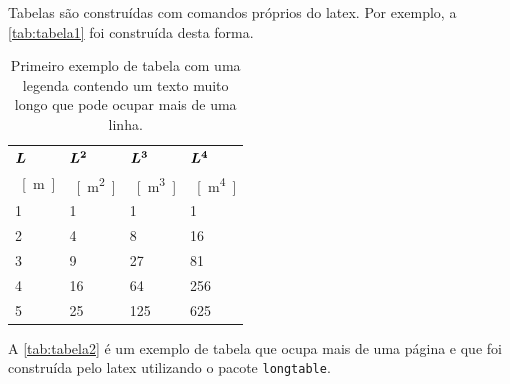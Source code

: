 Tabelas são construídas com comandos próprios do \gls{latex}. Por exemplo, a \autoref{tab:tabela1} foi construída desta forma.

\begin{table}[htb]%
\caption{Primeiro exemplo de tabela com uma legenda contendo um texto muito longo que pode ocupar mais de uma linha.}%
\label{tab:tabela1}%
\begin{tabularx}{\textwidth}{@{\extracolsep{\fill}}llll}%
\toprule
$\boldsymbol{L}$ & $\boldsymbol{L^2}$ & $\boldsymbol{L^3}$ & $\boldsymbol{L^4}$ \\
\SI{}{[m]} & \SI{}{[m^2]} & \SI{}{[m^3]} & \SI{}{[m^4]} \\ \midrule
1          & 1            & 1            & 1            \\
2          & 4            & 8            & 16           \\
3          & 9            & 27           & 81           \\
4          & 16           & 64           & 256          \\
5          & 25           & 125          & 625          \\ \bottomrule
\end{tabularx}
\end{table}

A \autoref{tab:tabela2} é um exemplo de tabela que ocupa mais de uma página e que foi construída pelo \gls{latex} utilizando o pacote \texttt{longtable}.

